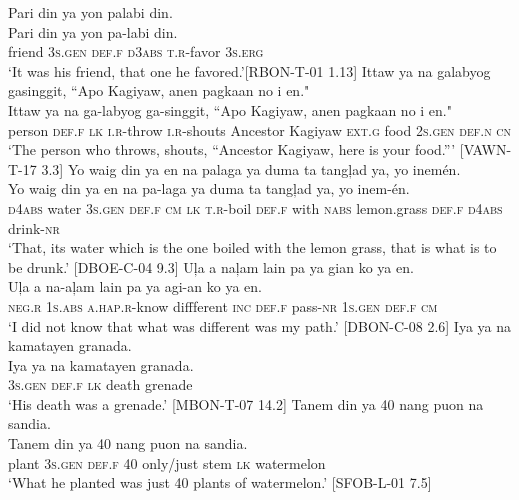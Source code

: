 \newpage
\ea 
Pari  din  ya  yon  palabi  din. \\\smallskip
\gll Pari  din  ya  yon  pa-labi  din. \\
friend  3\textsc{s.gen}  \textsc{def.f}  \textsc{d}3\textsc{abs}  \textsc{t.r}-favor  3\textsc{s.erg} \\
\glt ‘It was his friend, that one he favored.’[RBON-T-01 1.13]
\z
\ea 
Ittaw  ya  na  galabyog  gasinggit,  “Apo  Kagiyaw,  anen  pagkaan no  i  en." \\\smallskip
\gll Ittaw  ya  na  ga-labyog  ga-singgit,  “Apo  Kagiyaw,  anen  pagkaan no  i  en." \\
person  \textsc{def.f}  \textsc{lk}  \textsc{i.r}-throw  \textsc{i.r}-shouts  Ancestor  Kagiyaw  \textsc{ext.g}  food
2\textsc{s.gen}  \textsc{def.n}  \textsc{cn} \\
\glt `The person who throws, shouts, “Ancestor Kagiyaw, here is your food.”' [VAWN-T-17 3.3]
\z
\ea 
Yo  waig  din  ya  en  na  palaga  ya  duma  ta tangļad  ya,  yo  inemén. \\\smallskip
\gll Yo  waig  din  ya  en  na  pa-laga  ya  duma  ta tangļad  ya,  yo  inem-én. \\
\textsc{d}4\textsc{abs}  water  3\textsc{s.gen}  \textsc{def.f}  \textsc{cm}  \textsc{lk}  \textsc{t.r}-boil  \textsc{def.f}  with  \textsc{nabs}
lemon.grass  \textsc{def.f}  \textsc{d}4\textsc{abs}  drink-\textsc{nr} \\
\glt ‘That, its water which is the one boiled with the lemon grass, that is what is to be drunk.’ [DBOE-C-04 9.3]
\z
\ea 
Uļa  a  naļam  lain  pa  ya  gian  ko  ya  en.\\\smallskip
\gll Uļa  a  na-aļam  lain  pa  ya  agi-an  ko  ya  en.\\
\textsc{neg.r}  1\textsc{s.abs}  \textsc{a.hap.r}-know  diffferent  \textsc{inc}  \textsc{def.f}  pass-\textsc{nr}  1\textsc{s.gen}  \textsc{def.f}  \textsc{cm}\\
\glt ‘I did not know that what was different was my path.’ [DBON-C-08 2.6]
\z
\ea 
Iya  ya  na  kamatayen  granada. \\\smallskip
\gll Iya  ya  na  kamatayen  granada. \\
3\textsc{s.gen}  \textsc{def.f}  \textsc{lk}  death  grenade \\
\glt ‘His death was a grenade.’ [MBON-T-07 14.2]
\z
\ea 
Tanem  din  ya  40  nang  puon  na  sandia. \\\smallskip
\gll Tanem  din  ya  40  nang  puon  na  sandia. \\
plant  3\textsc{s.gen}  \textsc{def.f}  40  only/just  stem  \textsc{lk}  watermelon \\
\glt ‘What he planted was just 40 plants of watermelon.’ [SFOB-L-01 7.5]
\z
